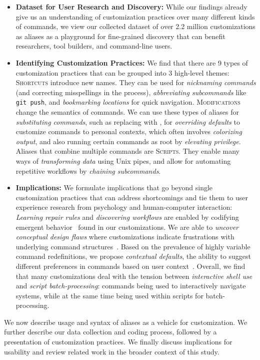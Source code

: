 \begin{itemize}[leftmargin=0.3cm]
	\item \textbf{Dataset for User Research and Discovery:} While our findings already give us an understanding of customization practices over many different kinds of commands, we view our collected dataset of over 2.2 million customizations as aliases as a playground for fine-grained discovery that can benefit researchers, tool builders, and command-line users.

	\item \textbf{Identifying Customization Practices:} We find that there are 9 types of customization practices that can be grouped into 3 high-level themes:
	\textsc{Shortcuts} introduce new names.
	They can be used for \emph{nicknaming commands} (and correcting misspellings in the process),
	\emph{abbreviating subcommands} like \texttt{git push},
	and \emph{bookmarking locations} for quick navigation.
	\textsc{Modifications} change the semantics of commands.
	We can use these types of aliases for \emph{substituting commands}, such as replacing  with ,
	for \emph{overriding defaults} to customize commands to personal contexts, 
	which often involves \emph{colorizing output},
	and also running certain commands as root by \emph{elevating privilege}.
	Aliases that combine multiple commands are \textsc{Scripts}.
	They enable many ways of \emph{transforming data} using Unix pipes, 
	and allow for automating repetitive workflows by \emph{chaining subcommands}.
	
	\item \textbf{Implications: } We formulate implications that go beyond single customization practices that can address shortcomings and tie them to user experience research from psychology and human-computer interaction:
	\emph{Learning repair rules} and \emph{discovering workflows} are enabled by codifying emergent behavior~\cite{fast:14} found in our customizations. We are able to \emph{uncover conceptual design flaws} where customizations indicate frustrations with underlying command structures~\cite{perez:13}.
	Based on the prevalence of highly variable command redefinitions, we propose \emph{contextual defaults}, the ability to suggest different preferences in commands based on user context~\cite{stefanidis:11}.
	Overall, we find that many customizations deal with the tension between \emph{interactive shell use} and \emph{script batch-processing}: commands being used to interactively navigate systems, while at the same time being used within scripts for batch-processing.
\end{itemize}

We now describe usage and syntax of aliases as a vehicle for customization. We further describe our data collection and coding process, followed by a presentation of customization practices. We finally discuss implications for usability and review related work in the broader context of this study.